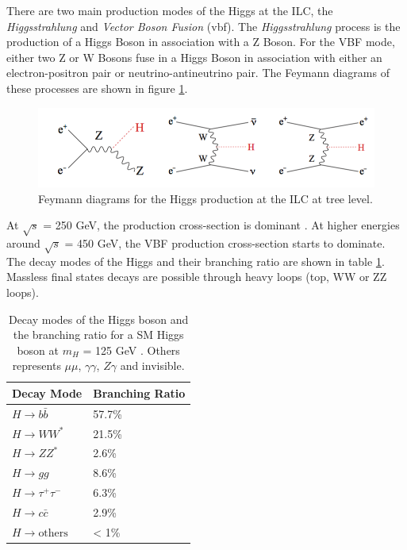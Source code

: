 There are two main production modes of the Higgs at the ILC, the \textit{Higgsstrahlung} and \textit{Vector Boson Fusion} (\acrshort{vbf}). The \textit{Higgsstrahlung} process is the production of a Higgs Boson in association with a Z Boson. For the VBF mode, either two Z or W Bosons fuse in a Higgs Boson in association with either an electron-positron pair or neutrino-antineutrino pair. The Feymann diagrams of these processes are shown in figure \ref{fig:HiggsProd}.

\begin{figure}[htbp!]
  \centering
  \includegraphics[width=1\linewidth]{chap2/fig/HiggsProd.png}
  \caption{Feymann diagrams for the Higgs production at the ILC at tree level. \cite{ILC_TDR_Vol2}} \label{fig:HiggsProd}
\end{figure}

At $\sqrt{s}$ = 250 GeV, the production cross-section is dominant \cite{Moortgat-Picka:2015yla}. At higher energies around $\sqrt{s}$ = 450 GeV, the VBF production cross-section starts to dominate. The decay modes of the Higgs and their branching ratio are shown in table \ref{table:BRHiggs}. Massless final states decays are possible through heavy loops (top, WW or ZZ loops).

\begin{table}
  \centering
  \caption{Decay modes of the Higgs boson and the branching ratio for a SM Higgs boson at $m_H$ = 125 GeV \cite{}. Others represents $\mu\mu$, $\gamma\gamma$, $Z\gamma$ and invisible.}
  \label{table:BRHiggs}
  \begin{tabular}{@{}ll@{}} \toprule
    Decay Mode & Branching Ratio \\ \midrule
    $H \rightarrow b\bar{b}$ & 57.7\% \\
    $H \rightarrow WW^*$ & 21.5\% \\
    $H \rightarrow ZZ^*$ & 2.6\% \\
    $H \rightarrow gg$ & 8.6\% \\
    $H \rightarrow \tau^+\tau^-$ & 6.3\% \\
    $H \rightarrow c\bar{c}$ & 2.9\% \\
    $H \rightarrow \text{others}$ & < 1\% \\
    \bottomrule
  \end{tabular}
\end{table}

